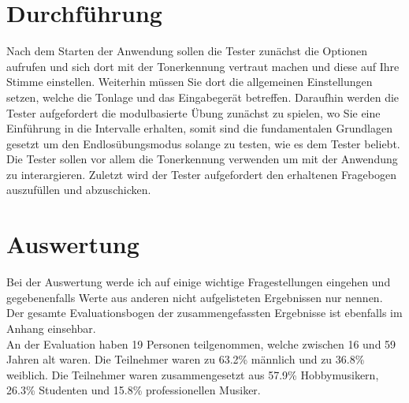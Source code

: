 \section{Durchführung}
Nach dem Starten der Anwendung sollen die Tester zunächst die Optionen aufrufen und sich dort mit der Tonerkennung vertraut machen und diese auf Ihre Stimme einstellen. Weiterhin müssen Sie dort die allgemeinen Einstellungen setzen, welche die Tonlage und das Eingabegerät betreffen. Daraufhin werden die Tester aufgefordert die modulbasierte Übung zunächst zu spielen, wo Sie eine Einführung in die Intervalle erhalten, somit sind die fundamentalen Grundlagen gesetzt um den Endlosübungsmodus solange zu testen, wie es dem Tester beliebt. Die Tester sollen vor allem die Tonerkennung verwenden um mit der Anwendung zu interargieren. Zuletzt wird der Tester aufgefordert den erhaltenen Fragebogen auszufüllen und abzuschicken. 

\newpage
\section{Auswertung}
Bei der Auswertung werde ich auf einige wichtige Fragestellungen eingehen und gegebenenfalls Werte aus anderen nicht aufgelisteten Ergebnissen nur nennen. Der gesamte Evaluationsbogen der zusammengefassten Ergebnisse ist ebenfalls im Anhang einsehbar. \\
An der Evaluation haben 19 Personen teilgenommen, welche zwischen 16 und 59 Jahren alt waren. Die Teilnehmer waren zu 63.2\% männlich und zu 36.8\% weiblich. Die Teilnehmer waren zusammengesetzt aus 57.9\% Hobbymusikern, 26.3\% Studenten und 15.8\% professionellen Musiker.   

